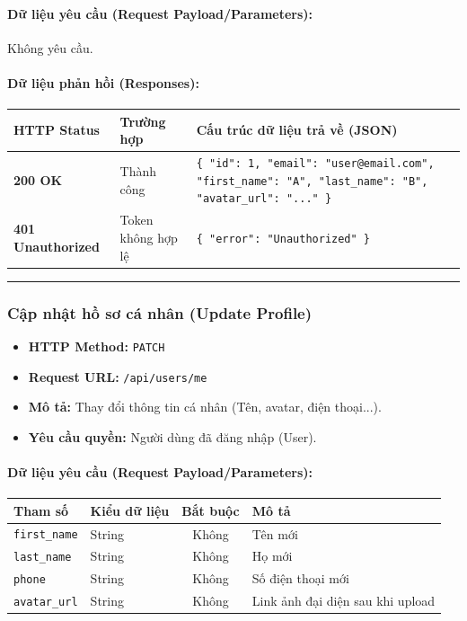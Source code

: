 \documentclass[12pt,a4paper]{article}
\begin{document}
\paragraph{Dữ liệu yêu cầu (Request Payload/Parameters):}
Không yêu cầu.\\

\paragraph{Dữ liệu phản hồi (Responses):}
\begin{longtable}{|>{\raggedright\arraybackslash}p{2.8cm}|>{\raggedright\arraybackslash}p{3.2cm}|>{\raggedright\arraybackslash}p{8.0cm}|}
\hline
\textbf{HTTP Status} & \textbf{Trường hợp} & \textbf{Cấu trúc dữ liệu trả về (JSON)} \\ \hline
\endhead
\textbf{200 OK} & Thành công & \texttt{\{ "id": 1, "email": "user@email.com", "first\_name": "A", "last\_name": "B", "avatar\_url": "..." \}} \\ \hline
\textbf{401 Unauthorized} & Token không hợp lệ & \texttt{\{ "error": "Unauthorized" \}} \\ \hline
\end{longtable}

\vskip 0.4cm
\noindent\rule{\textwidth}{0.3pt}
\vskip 0.4cm

\subsubsection{Cập nhật hồ sơ cá nhân (Update Profile)}
\begin{itemize}[leftmargin=*]
    \item \textbf{HTTP Method:} \texttt{PATCH}
    \item \textbf{Request URL:} \texttt{/api/users/me}
    \item \textbf{Mô tả:} Thay đổi thông tin cá nhân (Tên, avatar, điện thoại...).
    \item \textbf{Yêu cầu quyền:} Người dùng đã đăng nhập (User).
\end{itemize}

\paragraph{Dữ liệu yêu cầu (Request Payload/Parameters):}
\begin{longtable}{|>{\raggedright\arraybackslash}p{2.8cm}|>{\raggedright\arraybackslash}p{2.2cm}|c|>{\raggedright\arraybackslash}p{7.0cm}|}
\hline
\textbf{Tham số} & \textbf{Kiểu dữ liệu} & \textbf{Bắt buộc} & \textbf{Mô tả} \\ \hline
\endhead
\texttt{first\_name} & String & Không & Tên mới \\ \hline
\texttt{last\_name} & String & Không & Họ mới \\ \hline
\texttt{phone} & String & Không & Số điện thoại mới \\ \hline
\texttt{avatar\_url} & String & Không & Link ảnh đại diện sau khi upload \\ \hline
\end{longtable}
\end{document}
